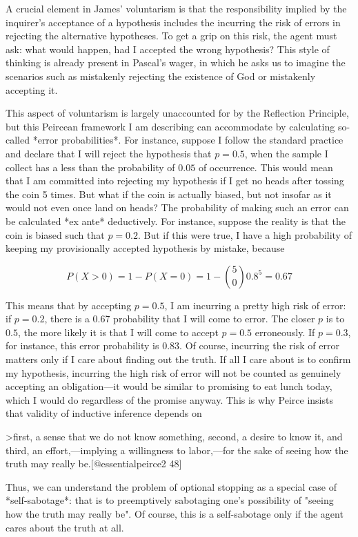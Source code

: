A crucial element in James' voluntarism is that the responsibility
implied by the inquirer's acceptance of a hypothesis includes the
incurring the risk of errors in rejecting the alternative hypotheses. To
get a grip on this risk, the agent must ask: what would happen, had I
accepted the wrong hypothesis? This style of thinking is already present
in Pascal's wager, in which he asks us to imagine the scenarios such as
mistakenly rejecting the existence of God or mistakenly accepting it.

This aspect of voluntarism is largely unaccounted for by the Reflection
Principle, but this Peircean framework I am describing can accommodate
by calculating so-called *error probabilities*. For instance, suppose I
follow the standard practice and declare that I will reject the
hypothesis that \(p=0.5\), when the sample I collect has a less than the
probability of \(0.05\) of occurrence. This would mean that I am
committed into rejecting my hypothesis if I get no heads after tossing
the coin 5 times. But what if the coin is actually biased, but not
insofar as it would not even once land on heads? The probability of
making such an error can be calculated *ex ante* deductively. For
instance, suppose the reality is that the coin is biased such that
\(p=0.2\). But if this were true, I have a high probability of keeping
my provisionally accepted hypothesis by mistake, because

\[P(X > 0) = 1 - P(X=0) = 1 - {5 \choose 0} 0.8^5 = 0.67\]

This means that by accepting \(p=0.5\), I am incurring a pretty high
risk of error: if \(p=0.2\), there is a 0.67 probability that I will
come to error. The closer \(p\) is to \(0.5\), the more likely it is
that I will come to accept \(p=0.5\) erroneously. If \(p=0.3\), for
instance, this error probability is \(0.83\). Of course, incurring the
risk of error matters only if I care about finding out the truth. If all
I care about is to confirm my hypothesis, incurring the high risk of
error will not be counted as genuinely accepting an obligation---it
would be similar to promising to eat lunch today, which I would do
regardless of the promise anyway. This is why Peirce insists that
validity of inductive inference depends on

\textgreater{}first, a sense that we do not know something, second, a
desire to know it, and third, an effort,---implying a willingness to
labor,---for the sake of seeing how the truth may really
be.{[}@essentialpeirce2 48{]}

Thus, we can understand the problem of optional stopping as a special
case of *self-sabotage*: that is to preemptively sabotaging one's
possibility of "seeing how the truth may really be". Of course, this is
a self-sabotage only if the agent cares about the truth at all.

